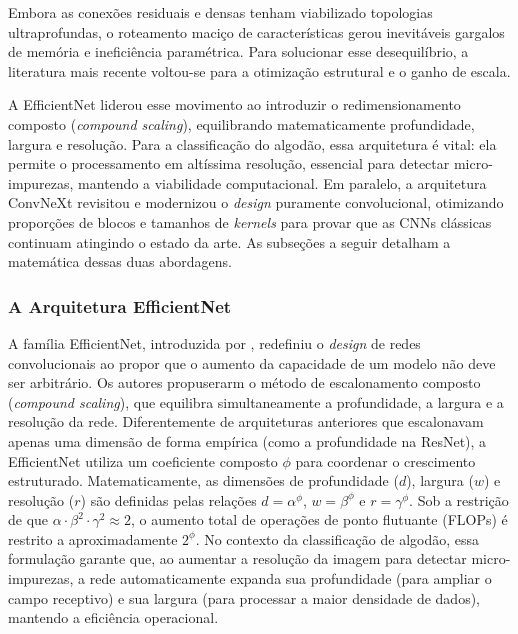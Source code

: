     Embora as conexões residuais e densas tenham viabilizado topologias ultraprofundas, o roteamento maciço de características gerou inevitáveis gargalos de memória e ineficiência paramétrica. Para solucionar esse desequilíbrio, a literatura mais recente voltou-se para a otimização estrutural e o ganho de escala.

    A EfficientNet liderou esse movimento ao introduzir o redimensionamento composto (\textit{compound scaling}), equilibrando matematicamente profundidade, largura e resolução. Para a classificação do algodão, essa arquitetura é vital: ela permite o processamento em altíssima resolução, essencial para detectar micro-impurezas, mantendo a viabilidade computacional. Em paralelo, a arquitetura ConvNeXt revisitou e modernizou o \textit{design} puramente convolucional, otimizando proporções de blocos e tamanhos de \textit{kernels} para provar que as CNNs clássicas continuam atingindo o estado da arte. As subseções a seguir detalham a matemática dessas duas abordagens.

    \subsubsection{A Arquitetura EfficientNet}

        A família EfficientNet, introduzida por , redefiniu o \textit{design} de redes convolucionais ao propor que o aumento da capacidade de um modelo não deve ser arbitrário. Os autores propuserarm o método de escalonamento composto (\textit{compound scaling}), que equilibra simultaneamente a profundidade, a largura e a resolução da rede. Diferentemente de arquiteturas anteriores que escalonavam apenas uma dimensão de forma empírica (como a profundidade na ResNet), a EfficientNet utiliza um coeficiente composto $\phi$ para coordenar o crescimento estruturado. Matematicamente, as dimensões de profundidade ($d$), largura ($w$) e resolução ($r$) são definidas pelas relações $d = \alpha^\phi$, $w = \beta^\phi$ e $r = \gamma^\phi$. Sob a restrição de que $\alpha \cdot \beta^2 \cdot \gamma^2 \approx 2$, o aumento total de operações de ponto flutuante (FLOPs) é restrito a aproximadamente $2^\phi$. No contexto da classificação de algodão, essa formulação garante que, ao aumentar a resolução da imagem para detectar micro-impurezas, a rede automaticamente expanda sua profundidade (para ampliar o campo receptivo) e sua largura (para processar a maior densidade de dados), mantendo a eficiência operacional.

